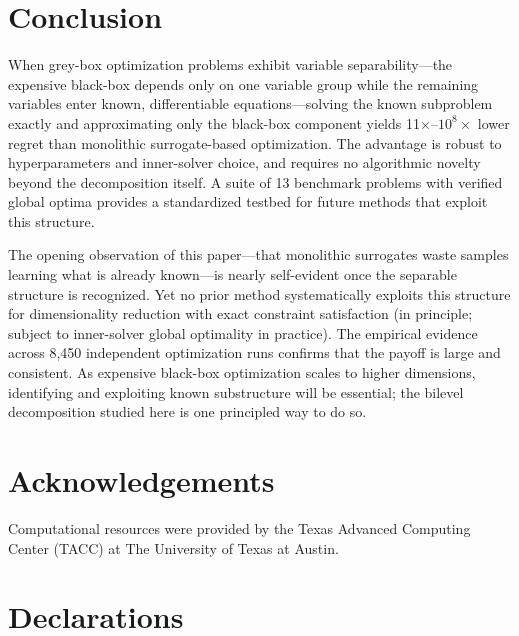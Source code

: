 \documentclass[12pt,a4paper]{article}%
\theoremstyle{plain}%
\theoremstyle{remark}%
\theoremstyle{definition}%
\begin{document}
\section{Conclusion}\label{sec:conclusion}

When grey-box optimization problems exhibit variable separability---the expensive black-box depends only on one variable group while the remaining variables enter known, differentiable equations---solving the known subproblem exactly and approximating only the black-box component yields 11$\times$--$10^{8}\times$ lower regret than monolithic surrogate-based optimization. The advantage is robust to hyperparameters and inner-solver choice, and requires no algorithmic novelty beyond the decomposition itself. A suite of 13 benchmark problems with verified global optima provides a standardized testbed for future methods that exploit this structure.

The opening observation of this paper---that monolithic surrogates waste samples learning what is already known---is nearly self-evident once the separable structure is recognized. Yet no prior method systematically exploits this structure for dimensionality reduction with exact constraint satisfaction (in principle; subject to inner-solver global optimality in practice). The empirical evidence across 8{,}450 independent optimization runs confirms that the payoff is large and consistent. As expensive black-box optimization scales to higher dimensions, identifying and exploiting known substructure will be essential; the bilevel decomposition studied here is one principled way to do so.

\section*{Acknowledgements}

Computational resources were provided by the Texas Advanced Computing Center (TACC) at The University of Texas at Austin.

\section*{Declarations}
\end{document}
